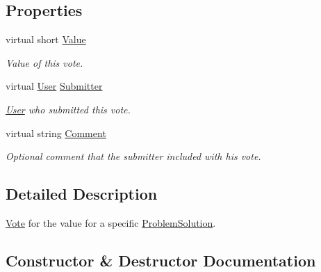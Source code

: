 \subsection*{Properties}
\begin{DoxyCompactItemize}
\item 
virtual short \mbox{\hyperlink{class_code_a_friend_1_1_data_model_1_1_vote_ac3c1e83e785dfc50317e3ca88e5efd4b}{Value}}
\begin{DoxyCompactList}\small\item\em Value of this vote.\end{DoxyCompactList}\item 
virtual \mbox{\hyperlink{class_code_a_friend_1_1_data_model_1_1_user}{User}} \mbox{\hyperlink{class_code_a_friend_1_1_data_model_1_1_vote_a98ece4448b25e79c07024c16e412e2c3}{Submitter}}
\begin{DoxyCompactList}\small\item\em \mbox{\hyperlink{class_code_a_friend_1_1_data_model_1_1_user}{User}} who submitted this vote.\end{DoxyCompactList}\item 
virtual string \mbox{\hyperlink{class_code_a_friend_1_1_data_model_1_1_vote_a470006d756d9b6f8b61a2cc97c6c9628}{Comment}}
\begin{DoxyCompactList}\small\item\em Optional comment that the submitter included with his vote.\end{DoxyCompactList}\end{DoxyCompactItemize}


\subsection{Detailed Description}
\mbox{\hyperlink{class_code_a_friend_1_1_data_model_1_1_vote}{Vote}} for the value for a specific \mbox{\hyperlink{class_code_a_friend_1_1_data_model_1_1_problem_solution}{Problem\+Solution}}. 



\subsection{Constructor \& Destructor Documentation}
\mbox{\label{class_code_a_friend_1_1_data_model_1_1_vote_af8e9b81421b774c013cc5a35cd7d463b}} 
